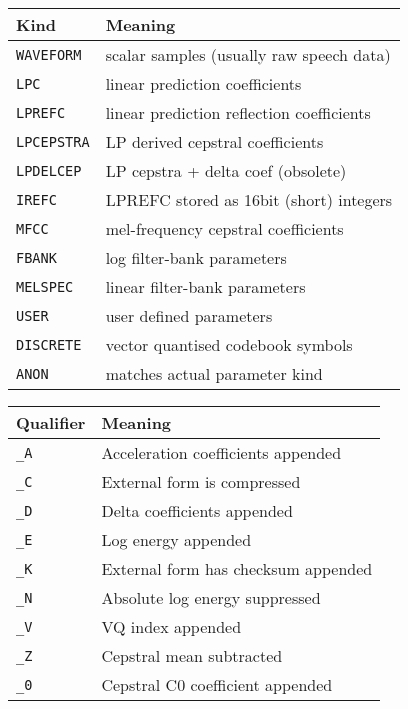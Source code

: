 \begin{center}
\begin{tabular}{|p{2.6cm}|p{8.7cm}|} \hline
Kind &  Meaning  \\ \hline
\texttt{WAVEFORM} & scalar samples (usually raw speech data)  \\
\texttt{LPC} & linear prediction coefficients  \\
\texttt{LPREFC} & linear prediction reflection coefficients  \\
\texttt{LPCEPSTRA}   & LP derived cepstral coefficients  \\
\texttt{LPDELCEP} & LP cepstra + delta coef (obsolete)  \\
\texttt{IREFC} & LPREFC stored as 16bit (short) integers  \\
\texttt{MFCC}  & mel-frequency cepstral coefficients  \\
\texttt{FBANK} & log filter-bank parameters  \\
\texttt{MELSPEC} & linear filter-bank parameters  \\
\texttt{USER} & user defined parameters  \\
\texttt{DISCRETE} &  vector quantised codebook symbols  \\
\texttt{ANON} & matches actual parameter kind \\ \hline
\end{tabular}
\end{center}

\begin{center}
\begin{tabular}{|p{2.6cm}|p{8.7cm}|} \hline
Qualifier &  Meaning  \\ \hline
\texttt{\_A} &  Acceleration coefficients appended \\
\texttt{\_C} &  External form is compressed\\
\texttt{\_D} &  Delta coefficients appended \\
\texttt{\_E} &  Log energy appended\\
\texttt{\_K} &  External form has checksum appended\\
\texttt{\_N} &  Absolute log energy suppressed \\
\texttt{\_V} &  VQ index appended\\
\texttt{\_Z} &  Cepstral mean subtracted\\
\texttt{\_0} &  Cepstral C0 coefficient appended\\ \hline
\end{tabular}
\end{center}

